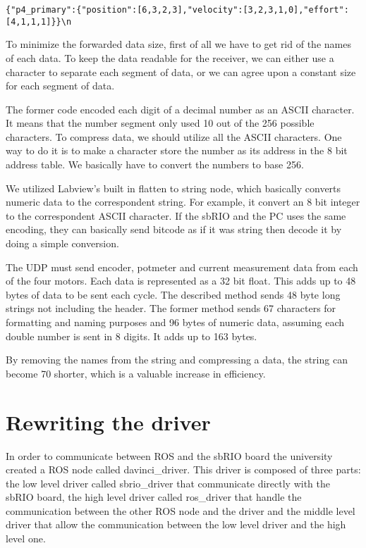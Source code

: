 \begin{verbatim}
{"p4_primary":{"position":[6,3,2,3],"velocity":[3,2,3,1,0],"effort":[4,1,1,1]}}\n
\end{verbatim}

To minimize the forwarded data size, first of all we have to get rid of the names of each data. To keep the data readable for the receiver, we can either use a character to separate each segment of data, or we can agree upon a constant size for each segment of data.

The former code encoded each digit of a decimal number as an ASCII character. It means that the number segment only used 10 out of the 256 possible characters. To compress data, we should utilize all the ASCII characters. One way to do it is to make a character store the number as its address in the 8 bit address table. We basically have to convert the numbers to base 256.

We utilized Labview's built in flatten to string node, which basically converts numeric data to the correspondent string. For example, it convert an 8 bit integer to the correspondent ASCII character. If the sbRIO and the PC uses the same encoding, they can basically send bitcode as if it was string then decode it by doing a simple conversion.  
 
The UDP must send encoder, potmeter and current measurement data from each of the four motors. Each data is represented as a 32 bit float. This adds up to 48 bytes of data to be sent each cycle. The described method sends 48 byte long strings not including the header. The former method sends 67 characters for formatting and naming purposes and 96 bytes of numeric data, assuming each double number is sent in 8 digits. It adds up to 163 bytes.

By removing the names from the string and compressing a data, the string can become 70 shorter, which is a valuable increase in efficiency.



\section{Rewriting the driver}

In order to communicate between ROS and the sbRIO board the university created a ROS node called davinci\_driver. This driver is composed of three parts: the low level driver called sbrio\_driver that communicate directly with the sbRIO board, the high level driver called ros\_driver that handle the communication between the other ROS node and the driver and the middle level driver that allow the communication between the low level driver and the high level one.

